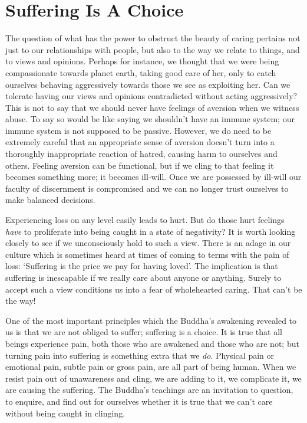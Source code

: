 \section{Suffering Is A Choice}

The question of what has the power to obstruct the beauty of caring
pertains not just to our relationships with people, but also to the way
we relate to things, and to views and opinions. Perhaps for instance, we
thought that we were being compassionate towards planet earth, taking
good care of her, only to catch ourselves behaving aggressively towards
those we see as exploiting her. Can we tolerate having our views and
opinions contradicted without acting aggressively? This is not to say
that we should never have feelings of aversion when we witness abuse. To
say so would be like saying we shouldn’t have an immune system; our
immune system is not supposed to be passive. However, we do need to be
extremely careful that an appropriate sense of aversion doesn’t turn
into a thoroughly inappropriate reaction of hatred, causing harm to
ourselves and others. Feeling aversion can be functional, but if we
cling to that feeling it becomes something more; it becomes ill-will.
Once we are possessed by ill-will our faculty of discernment is
compromised and we can no longer trust ourselves to make balanced
decisions.

Experiencing loss on any level easily leads to hurt. But do those hurt
feelings \emph{have} to proliferate into being caught in a state of
negativity? It is worth looking closely to see if we unconsciously hold
to such a view. There is an adage in our culture which is sometimes
heard at times of coming to terms with the pain of loss: ‘Suffering is
the price we pay for having loved’. The implication is that suffering is
inescapable if we really care about anyone or anything. Surely to accept
such a view conditions us into a fear of wholehearted caring. That can’t
be the way!

One of the most important principles which the Buddha’s awakening
revealed to us is that we are not obliged to suffer; suffering is a
choice. It is true that all beings experience pain, both those who are
awakened and those who are not; but turning pain into suffering is
something extra that we \emph{do}. Physical pain or emotional pain, subtle
pain or gross pain, are all part of being human. When we resist pain out
of unawareness and cling, we are adding to it, we complicate it, we are
causing the suffering. The Buddha’s teachings are an invitation to
question, to enquire, and find out for ourselves whether it is true that
we can’t care without being caught in clinging.

